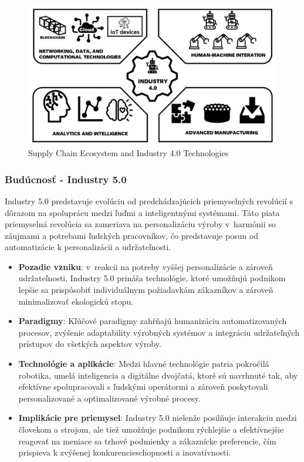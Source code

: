 \begin{figure}[h]
    \centering
    \includegraphics[width=1\textwidth]{img/logistics-06-00081-g003.png}
    \caption{Supply Chain Ecosystem and Industry 4.0 Technologies \cite{rajasanthi2022industry40}}
    \label{fig:industry40}
\end{figure}

\subsubsection{Budúcnosť - Industry 5.0}

Industry 5.0 predstavuje evolúciu od predchádzajúcich priemyselných revolúcií s dôrazom na spoluprácu medzi ľuďmi a inteligentnými systémami. Táto piata priemyselná revolúcia sa zameriava na personalizáciu výroby v~harmónii so záujmami a potrebami ľudských pracovníkov, čo predstavuje posun od automatizácie k personalizácii a udržateľnosti.

\begin{itemize}
\item \textbf{Pozadie vzniku}: v~reakcii na potreby vyššej personalizácie a zároveň udržateľnosti, Industry 5.0 prináša technológie, ktoré umožňujú podnikom lepšie sa prispôsobiť individuálnym požiadavkám zákazníkov a zároveň minimalizovať ekologickú stopu.

\item \textbf{Paradigmy}: Kľúčové paradigmy zahŕňajú humanizáciu automatizovaných procesov, zvýšenie adaptability výrobných systémov a integráciu udržateľných prístupov do všetkých aspektov výroby.

\item \textbf{Technológie a aplikácie}: Medzi hlavné technológie patria pokročilá robotika, umelá inteligencia a digitálne dvojčatá, ktoré sú navrhnuté tak, aby efektívne spolupracovali s ľudskými operátormi a zároveň poskytovali personalizované a optimalizované výrobné procesy.

\item \textbf{Implikácie pre priemysel}: Industry 5.0 nielenže posilňuje interakciu medzi človekom a strojom, ale tiež umožňuje podnikom rýchlejšie a efektívnejšie reagovať na meniace sa trhové podmienky a zákaznícke preferencie, čím prispieva k zvýšenej konkurencieschopnosti a inovatívnosti.

\end{itemize}

